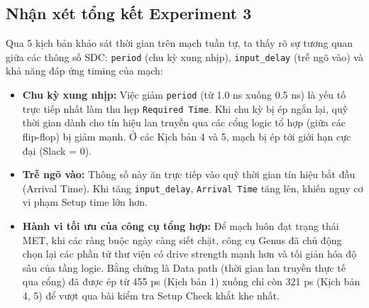 \documentclass[12pt, a4paper, oneside]{article}
\begin{document}
\subsection{Nhận xét tổng kết Experiment 3}
Qua 5 kịch bản khảo sát thời gian trên mạch tuần tự, ta thấy rõ sự tương quan giữa các thông số SDC: \texttt{period} (chu kỳ xung nhịp), \texttt{input\_delay} (trễ ngõ vào) và khả năng đáp ứng timing của mạch:
\begin{itemize}
    \item \textbf{Chu kỳ xung nhịp:} Việc giảm \texttt{period} (từ 1.0 ns xuống 0.5 ns) là yếu tố trực tiếp nhất làm thu hẹp \texttt{Required Time}. Khi chu kỳ bị ép ngắn lại, quỹ thời gian dành cho tín hiệu lan truyền qua các cổng logic tổ hợp (giữa các flip-flop) bị giảm mạnh. Ở các Kịch bản 4 và 5, mạch bị ép tới giới hạn cực đại (Slack = 0).
    \item \textbf{Trễ ngõ vào:} Thông số này ăn trực tiếp vào quỹ thời gian tín hiệu bắt đầu (Arrival Time). Khi tăng \texttt{input\_delay}, \texttt{Arrival Time} tăng lên, khiến nguy cơ vi phạm Setup time lớn hơn.
    \item \textbf{Hành vi tối ưu của công cụ tổng hợp:} Để mạch luôn đạt trạng thái MET, khi các ràng buộc ngày càng siết chặt, công cụ Genus đã chủ động chọn lại các phần tử thư viện có drive strength mạnh hơn và tối giản hóa độ sâu của tầng logic. Bằng chứng là Data path (thời gian lan truyền thực tế qua cổng) đã được ép từ 455 ps (Kịch bản 1) xuống chỉ còn 321 ps (Kịch bản 4, 5) để vượt qua bài kiểm tra Setup Check khắt khe nhất.
\end{itemize}
\end{document}

